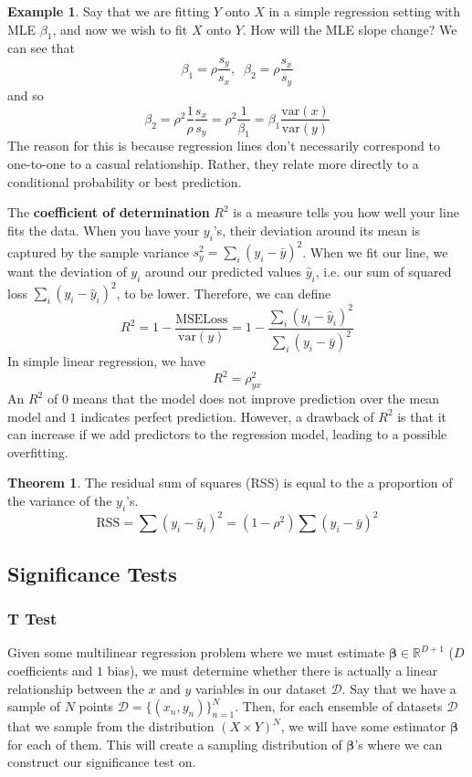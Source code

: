 \documentclass{article}
\theoremstyle{definition}
\newtheorem{theorem}{Theorem}[section]
\newtheorem{example}{Example}[section]
\begin{document}
  \begin{example}
  Say that we are fitting $Y$ onto $X$ in a simple regression setting with MLE $\beta_1$, and now we wish to fit $X$ onto $Y$. How will the MLE slope change? We can see that 
  \[\beta_1 = \rho \frac{s_y}{s_x} , \;\; \beta_2 = \rho \frac{s_x}{s_y}\]
  and so 
  \[\beta_2 = \rho^2 \frac{1}{\rho} \frac{s_x}{s_y} = \rho^2 \frac{1}{\beta_1} = \beta_1 \frac{\mathrm{var}(x)}{\mathrm{var}(y)}\]
  The reason for this is because regression lines don't necessarily correspond to one-to-one to a casual relationship. Rather, they relate more directly to a conditional probability or best prediction. 
  \end{example}

  The \textbf{coefficient of determination} $R^2$ is a measure tells you how well your line fits the data. When you have your $y_i$'s, their deviation around its mean is captured by the sample variance $s^2_y = \sum_i (y_i - \bar{y})^2$. When we fit our line, we want the deviation of $y_i$ around our predicted values $\hat{y}_i$, i.e. our sum of squared loss $\sum_i (y_i - \hat{y}_i)^2$, to be lower. Therefore, we can define 
  \[R^2 = 1 - \frac{\mathrm{MSE Loss}}{\mathrm{var}(y)} = 1 - \frac{\sum_i (y_i - \hat{y}_i)^2}{\sum_i (y_i - \bar{y})^2}\]
  In simple linear regression, we have 
  \[R^2 = \rho_{yx}^2\]
  An $R^2$ of $0$ means that the model does not improve prediction over the mean model and $1$ indicates perfect prediction. However, a drawback of $R^2$ is that it can increase if we add predictors to the regression model, leading to a possible overfitting. 

  \begin{theorem}
  The residual sum of squares (RSS) is equal to the a proportion of the variance of the $y_i$'s. 
  \[\mathrm{RSS} = \sum (y_i - \hat{y}_i)^2 = (1 - \rho^2) \sum (y_i - \bar{y})^2 \]
  \end{theorem}

  \subsection{Significance Tests}

  \subsubsection{T Test}

  Given some multilinear regression problem where we must estimate $\boldsymbol{\beta} \in \mathbb{R}^{D + 1}$ ($D$ coefficients and $1$ bias), we must determine whether there is actually a linear relationship between the $x$ and $y$ variables in our dataset $\mathcal{D}$. Say that we have a sample of $N$ points $\mathcal{D} = \{(x_n, y_n)\}_{n=1}^N$. Then, for each ensemble of datasets $\mathcal{D}$ that we sample from the distribution $(X \times Y)^N$, we will have some estimator $\boldsymbol{\beta}$ for each of them. This will create a sampling distribution of $\boldsymbol{\beta}$'s where we can construct our significance test on. 
\end{document}
